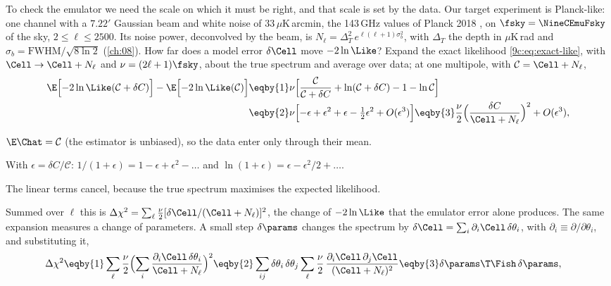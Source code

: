 To check the emulator we need the scale on which it must be right, and that scale is set by the data. Our
target experiment is Planck-like: one channel with a $7.22'$ Gaussian beam and white noise of
$33\,\mu$K\,arcmin, the 143\,GHz values of Planck 2018 \cite{Planck2018I}, on $\fsky=\NineCEmuFsky$ of the sky,
$2\le\ell\le2500$. Its noise power, deconvolved by the beam, is
$N_\ell=\Delta_T^2\,e^{\ell(\ell+1)\sigma_b^2}$, with $\Delta_T$ the depth in $\mu$K\,rad and
$\sigma_b=\mathrm{FWHM}/\sqrt{8\ln2}$ (\cref{ch:08}). How far does a model error $\delta\Cell$ move $-2\ln\Like$?
Expand the exact likelihood \eqref{9c:eq:exact-like}, with $\Cell\to\Cell+N_\ell$ and $\nu=(2\ell+1)\fsky$, about
the true spectrum and average over data; at one multipole, with $\mathcal C=\Cell+N_\ell$,
\begin{align}
  \E\Bigl[-2\ln\Like(\mathcal C+\delta C)\Bigr]-\E\Bigl[-2\ln\Like(\mathcal C)\Bigr]
  &\eqby{1}\nu\Bigl[\frac{\mathcal C}{\mathcal C+\delta C}+\ln(\mathcal C+\delta C)-1-\ln\mathcal C\Bigr]
   \nonumber\\
  &\eqby{2}\nu\Bigl[-\epsilon+\epsilon^2+\epsilon-\tfrac12\epsilon^2+O(\epsilon^3)\Bigr]
   \eqby{3}\frac\nu2\Bigl(\frac{\delta C}{\Cell+N_\ell}\Bigr)^2+O(\epsilon^3),
  \label{9c:eq:dchi2}
\end{align}
\begin{explain}
  \item $\E\Chat=\mathcal C$ (the estimator is unbiased), so the data enter only through their mean.
  \item With $\epsilon=\delta C/\mathcal C$: $1/(1+\epsilon)=1-\epsilon+\epsilon^2-\dots$ and
        $\ln(1+\epsilon)=\epsilon-\epsilon^2/2+\dots$.
  \item The linear terms cancel, because the true spectrum maximises the expected likelihood.
\end{explain}
Summed over $\ell$ this is $\Delta\chi^2=\sum_\ell\frac\nu2[\delta\Cell/(\Cell+N_\ell)]^2$, the change of $-2\ln\Like$
that the emulator error alone produces. The same expansion measures a change of parameters. A small step
$\delta\params$ changes the spectrum by $\delta\Cell=\sum_i\partial_i\Cell\,\delta\theta_i$, with
$\partial_i\equiv\partial/\partial\theta_i$, and substituting it,
\begin{align}
  \Delta\chi^2
  &\eqby{1}\sum_\ell\frac\nu2\Bigl(\sum_i\frac{\partial_i\Cell\,\delta\theta_i}{\Cell+N_\ell}\Bigr)^2
   \eqby{2}\sum_{ij}\delta\theta_i\,\delta\theta_j\sum_\ell\frac\nu2\,\frac{\partial_i\Cell\,\partial_j\Cell}{(\Cell+N_\ell)^2}
   \eqby{3}\delta\params\T\Fish\,\delta\params ,
  \label{9c:eq:dchi2-fisher}
\end{align}
